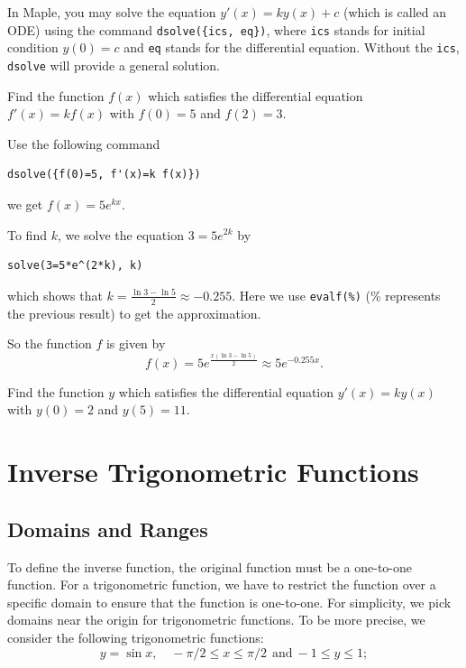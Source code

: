 \documentclass[]{book}
\theoremstyle{definition}
\theoremstyle{definition}
\theoremstyle{definition}
\theoremstyle{remark}
\let\BeginKnitrBlock\begin \let\EndKnitrBlock\end
\begin{document}
In Maple, you may solve the equation \(y'(x)=k y(x) + c\) (which is called an ODE) using the command \texttt{dsolve(\{ics,\ eq\})}, where \texttt{ics} stands for initial condition \(y(0)=c\) and \texttt{eq} stands for the differential equation. Without the \texttt{ics}, \texttt{dsolve} will provide a general solution.

\BeginKnitrBlock{example}
\protect\hypertarget{exm:unnamed-chunk-1}{}{\label{exm:unnamed-chunk-1} }Find the function \(f(x)\) which satisfies the differential equation \(f'(x)=k f(x)\) with \(f(0)=5\) and \(f(2)=3\).
\EndKnitrBlock{example}

\BeginKnitrBlock{solution}
{}
Use the following command

\begin{verbatim}
dsolve({f(0)=5, f'(x)=k f(x)})
\end{verbatim}

we get \(f(x)=5e^{kx}\).

To find \(k\), we solve the equation \(3=5e^{2k}\) by

\begin{verbatim}
solve(3=5*e^(2*k), k)
\end{verbatim}

which shows that \(k=\frac{\ln3-\ln5}{2}\approx -0.255\).
Here we use \texttt{evalf(\%)} (\% represents the previous result) to get the approximation.

So the function \(f\) is given by
\[
f(x)=5e^{\frac{x(\ln3-\ln5)}{2}}\approx 5e^{-0.255x}.
\]
\EndKnitrBlock{solution}

\BeginKnitrBlock{exercise}
\protect\hypertarget{exr:unnamed-chunk-3}{}{\label{exr:unnamed-chunk-3} }
Find the function \(y\) which satisfies the differential equation \(y'(x)=k y(x)\) with \(y(0)=2\) and \(y(5)=11\).
\EndKnitrBlock{exercise}

\hypertarget{inverse-trigonometric-functions}{%
\chapter{Inverse Trigonometric Functions}\label{inverse-trigonometric-functions}}

\hypertarget{domains-and-ranges}{%
\section{Domains and Ranges}\label{domains-and-ranges}}

To define the inverse function, the original function must be a one-to-one function.
For a trigonometric function, we have to restrict the function over a specific domain to ensure that the function is one-to-one.
For simplicity, we pick domains near the origin for trigonometric functions. To be more precise, we consider the following trigonometric functions:
\[
y=\sin x,\quad -\pi/2\leq x\leq \pi/2 ~~\text{and}~ -1\leq y\leq 1;
\]
\end{document}
